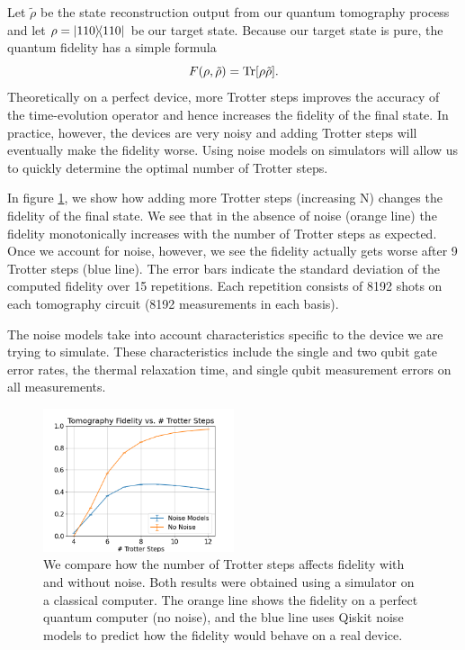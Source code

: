 \documentclass[aps,prl, reprint]{revtex4-2}
\begin{document}
Let $\tilde{\rho}$ be the state reconstruction output from our quantum tomography process and let $\rho = \dyad{110}$ be our target state. Because our target state is pure, the quantum fidelity has a simple formula \cite{liang2019quantum}
\begin{equation}
F(\rho, \tilde{\rho}) = \Tr[\rho\tilde{\rho}].
\end{equation}
Theoretically on a perfect device, more Trotter steps improves the accuracy of the time-evolution operator and hence increases the fidelity of the final state. In practice, however, the devices are very noisy and adding Trotter steps will eventually make the fidelity worse. Using noise models on simulators will allow us to quickly determine the optimal number of Trotter steps. 

In figure \ref{fig:SimFids}, we show how adding more Trotter steps (increasing N) changes the fidelity of the final state. We see that in the absence of noise (orange line) the fidelity monotonically increases with the number of Trotter steps as expected. Once we account for noise, however, we see the fidelity actually gets worse after 9 Trotter steps (blue line). The error bars indicate the standard deviation of the computed fidelity over 15 repetitions. Each repetition consists of 8192 shots on each tomography circuit (8192 measurements in each basis).

The noise models take into account characteristics specific to the device we are trying to simulate. These characteristics include the single and two qubit gate error rates, the thermal relaxation time, and single qubit measurement errors on all measurements. 
\begin{figure}
\includegraphics[width=0.5\textwidth]{../TomographyFidelities.png}
\caption{We compare how the number of Trotter steps affects fidelity with and without noise. Both results were obtained using a simulator on a classical computer. The orange line shows the fidelity on a perfect quantum computer (no noise), and the blue line uses Qiskit noise models to predict how the fidelity would behave on a real device.}
\label{fig:SimFids}
\end{figure}
\end{document}
